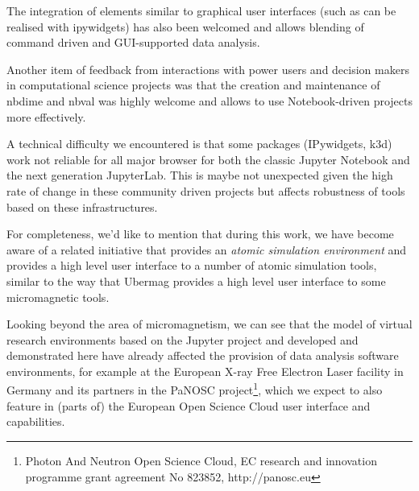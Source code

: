 \documentclass{deliverablereport}
\begin{document}
The integration of elements similar to graphical user interfaces (such
as can be realised with ipywidgets) has also been welcomed and allows
blending of command driven and GUI-supported data analysis.

Another item of feedback from interactions with power users and
decision makers in computational science projects was that the
creation and maintenance of nbdime and nbval was highly welcome and
allows to use Notebook-driven projects more effectively.

A technical difficulty we encountered is that some packages
(IPywidgets, k3d) work not reliable for all major browser for both the
classic Jupyter Notebook and the next generation JupyterLab. This is
maybe not unexpected given the high rate of change in these community
driven projects but affects robustness of tools based on these
infrastructures.

For completeness, we'd like to mention that during this work, we have
become aware of a related initiative\cite{ase-paper} that provides an \emph{atomic
  simulation environment} and provides a high level user interface to
a number of atomic simulation tools, similar to the way that Ubermag
provides a high level user interface to some micromagnetic tools.

Looking beyond the area of micromagnetism, we can see that the model
of virtual research environments based on the Jupyter project and
developed and demonstrated here have already affected the provision of
data analysis software environments, for example at the European X-ray
Free Electron Laser facility in Germany and its partners in the PaNOSC
project\footnote{Photon And Neutron Open Science Cloud, EC research
  and innovation programme grant agreement No 823852,
  http://panosc.eu}, which we expect to also feature in (parts of) the
European Open Science Cloud user interface and capabilities.

\newpage\printbibliography
\end{document}
